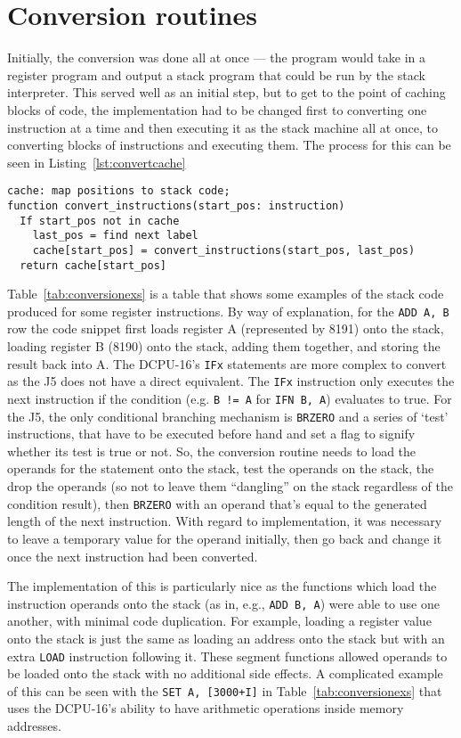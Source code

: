 \section{Conversion routines}
Initially, the conversion was done all at once --- the program would take in a
register program and output a stack program that could be run by the stack
interpreter. This served well as an initial step, but to get to the point of
caching blocks of code, the implementation had to be changed first to converting
one instruction at a time and then executing it as the stack machine all at
once, to converting blocks of instructions and executing them. The process for
this can be seen in Listing~\ref{lst:convertcache}

\begin{lstlisting}[label={lst:convertcache},caption={Converted instruction
caching},float]
cache: map positions to stack code;
function convert_instructions(start_pos: instruction)
  If start_pos not in cache
    last_pos = find next label
    cache[start_pos] = convert_instructions(start_pos, last_pos)
  return cache[start_pos]
\end{lstlisting}

Table~\ref{tab:conversionexs} is a table that shows some examples of the stack
code produced for some register instructions. By way of explanation, for the
\lstinline{ADD A, B} row the code snippet first loads register A (represented by
8191) onto the stack, loading register B (8190) onto the stack, adding them
together, and storing the result back into A. The DCPU-16's \lstinline{IFx}
statements are more complex to convert as the J5 does not have a direct
equivalent. The \lstinline{IFx} instruction only executes the next instruction
if the condition (e.g. \lstinline{B != A} for \lstinline{IFN B, A}) evaluates to
true. For the J5, the only conditional branching mechanism is \lstinline{BRZERO}
and a series of `test' instructions, that have to be executed before hand and
set a flag to signify whether its test is true or not. So, the conversion
routine needs to load the operands for the statement onto the stack, test the
operands on the stack, the drop the operands (so not to leave them ``dangling''
on the stack regardless of the condition result), then \lstinline{BRZERO} with
an operand that's equal to the generated length of the next instruction.  With
regard to implementation, it was necessary to leave a temporary value for the
operand initially, then go back and change it once the next instruction had been
converted.

The implementation of this is particularly nice as the functions which load the
instruction operands onto the stack (as in, e.g., \lstinline{ADD B, A}) were
able to use one another, with minimal code duplication. For example, loading a
register value onto the stack is just the same as loading an address onto the
stack but with an extra \lstinline{LOAD} instruction following it. These segment
functions allowed operands to be loaded onto the stack with no additional
side effects. A complicated example of this can be seen with the
\lstinline{SET A, [3000+I]} in Table~\ref{tab:conversionexs} that uses the
DCPU-16's ability to have arithmetic operations inside memory addresses.

